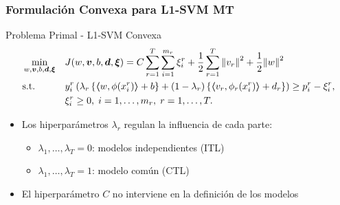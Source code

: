 \documentclass[aspectratio=43]{beamer}
\newcommand{\norm}[1]{\left\lVert#1\right\rVert}
\newcommand{\myvec}[1]{\bm{#1}}
\newcommand{\fv}[1]{\myvec{#1}}
\newcommand{\dotp}[2]{\bm{\left\langle} #1, #2 \bm{\right\rangle}}
\newcommand{\ntasks}{T}
\begin{document}
  \begin{frame}
      \frametitle{Formulación Convexa para L1-SVM MT}
  
      \begin{block}{Problema Primal - L1-SVM Convexa}
            \begin{equation}\nonumber
                  \begin{aligned}
                  & \min_{w, \fv{v}, b, \fv{d}, \fv{\xi}}
                  & & {J({w}, \fv{v}, b, \fv{d}, \fv{\xi}) = C \sum_{r= 1}^T \sum_{i=1}^{m_r} {\xi_{i}^r} + \frac{1}{2} \sum_{r= 1}^T{\norm{{v}_r}^2} + \frac{1}{2} {\norm{{w}}}^2} \\
                  & \text{s.t.}
                  & & y_{i}^r \left(\lambda_r \left\lbrace \dotp{w}{\phi(x_{i}^r)} + b  \right\rbrace + (1 - \lambda_r) \left\lbrace \dotp{{v}_r}{\phi_r(x_{i}^r)} + d_r \right\rbrace  \right) \geq p_{i}^r - \xi_{i}^r ,  \\
                  & & & \xi_{i}^r \geq 0, \;  i=1 , \dotsc , m_r, \;  r= 1,\dotsc, T  . \\
                  \end{aligned}
              \end{equation}   
      \end{block}
      \begin{itemize}
            \item Los hiperparámetros $\lambda_r$ regulan la influencia de cada parte:
            \begin{itemize}
                \item $\lambda_1, \ldots, \lambda_\ntasks=0$: modelos independientes (ITL)
                \item $\lambda_1, \ldots, \lambda_\ntasks=1$: modelo común (CTL)
            \end{itemize}
            \item El hiperparámetro $C$ no interviene en la definición de los modelos
      \end{itemize}

  \end{frame}
\end{document}
